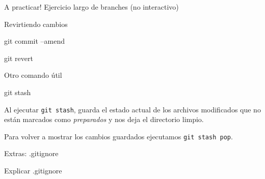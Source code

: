 \begin{frame}[t]{A practicar!}
    Ejercicio largo de branches (no interactivo)

\end{frame}

\begin{frame}[t]{Revirtiendo cambios}
    \begin{comando}
        git commit --amend
    \end{comando}


    \vspace{2em}

    \begin{comando}
        git revert
    \end{comando}

\end{frame}

\begin{frame}[t]{Otro comando útil}
    \begin{comando}
        git stash
    \end{comando}

    \pause
    \begin{block}{}
        Al ejecutar \texttt{git stash}, guarda el estado actual de los archivos modificados que no están marcados como \textit{preparados} y nos deja el directorio limpio.

        \vspace{0.5em}

        Para volver a mostrar los cambios guardados ejecutamos \texttt{git stash pop}.
    \end{block}
\end{frame}

\begin{frame}[t]{Extras: .gitignore}

    Explicar .gitignore

\end{frame}

